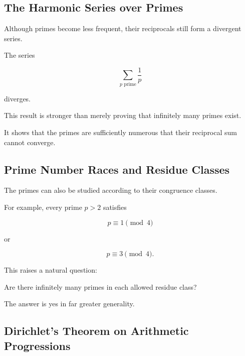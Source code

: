 \subsection{The Harmonic Series over Primes}
\label{subsec:sum-reciprocals-primes}

Although primes become less frequent, their reciprocals still form a
divergent series.

\begin{theorem}
The series

\[ \boxed{\sum_{p\text{ prime}}\frac1p} \]

diverges.
\end{theorem}

This result is stronger than merely proving that infinitely many primes
exist.

It shows that the primes are sufficiently numerous that their reciprocal
sum cannot converge.

\subsection{Prime Number Races and Residue Classes}
\label{subsec:prime-residue-classes}

The primes can also be studied according to their congruence classes.

For example, every prime \(p>2\) satisfies

\[ p\equiv1\pmod4 \]

or

\[ p\equiv3\pmod4. \]

This raises a natural question:

\begin{center}
Are there infinitely many primes in each allowed residue class?
\end{center}

The answer is yes in far greater generality.

\subsection{Dirichlet's Theorem on Arithmetic Progressions}
\label{subsec:dirichlet-theorem-arithmetic-progressions}

